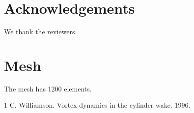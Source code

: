 \documentclass{article}
\begin{document}
\section*{Acknowledgements}
We thank the reviewers.
\appendix
\section{Mesh}
The mesh has 1200 elements.
\begin{thebibliography}{1}
 C. Williamson. Vortex dynamics in the cylinder wake. 1996.
\end{thebibliography}
\end{document}
